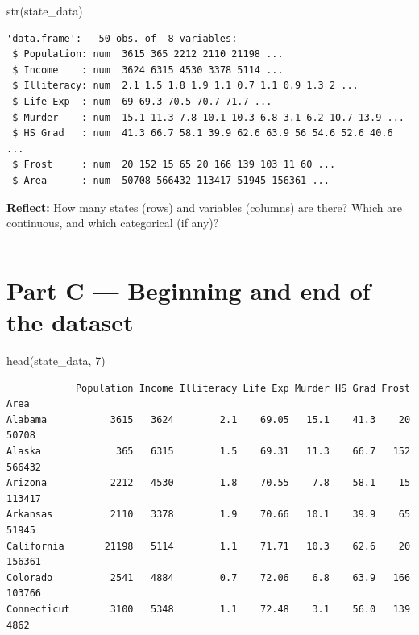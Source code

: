 \documentclass[
  letterpaper,
  DIV=11,
  numbers=noendperiod]{scrreprt}
\newenvironment{Shaded}{\begin{snugshade}}{\end{snugshade}}
\newcommand{\DecValTok}[1]{\textcolor[rgb]{0.68,0.00,0.00}{#1}}
\newcommand{\FunctionTok}[1]{\textcolor[rgb]{0.28,0.35,0.67}{#1}}
\newcommand{\NormalTok}[1]{\textcolor[rgb]{0.00,0.23,0.31}{#1}}
\begin{document}
\begin{Shaded}
\begin{Highlighting}[]
\FunctionTok{str}\NormalTok{(state\_data)}
\end{Highlighting}
\end{Shaded}

\begin{verbatim}
'data.frame':   50 obs. of  8 variables:
 $ Population: num  3615 365 2212 2110 21198 ...
 $ Income    : num  3624 6315 4530 3378 5114 ...
 $ Illiteracy: num  2.1 1.5 1.8 1.9 1.1 0.7 1.1 0.9 1.3 2 ...
 $ Life Exp  : num  69 69.3 70.5 70.7 71.7 ...
 $ Murder    : num  15.1 11.3 7.8 10.1 10.3 6.8 3.1 6.2 10.7 13.9 ...
 $ HS Grad   : num  41.3 66.7 58.1 39.9 62.6 63.9 56 54.6 52.6 40.6 ...
 $ Frost     : num  20 152 15 65 20 166 139 103 11 60 ...
 $ Area      : num  50708 566432 113417 51945 156361 ...
\end{verbatim}

\textbf{Reflect:} How many states (rows) and variables (columns) are
there? Which are continuous, and which categorical (if any)?

\begin{center}\rule{0.5\linewidth}{0.5pt}\end{center}

\section{Part C --- Beginning and end of the
dataset}\label{part-c-beginning-and-end-of-the-dataset}

\begin{Shaded}
\begin{Highlighting}[]
\FunctionTok{head}\NormalTok{(state\_data, }\DecValTok{7}\NormalTok{)}
\end{Highlighting}
\end{Shaded}

\begin{verbatim}
            Population Income Illiteracy Life Exp Murder HS Grad Frost   Area
Alabama           3615   3624        2.1    69.05   15.1    41.3    20  50708
Alaska             365   6315        1.5    69.31   11.3    66.7   152 566432
Arizona           2212   4530        1.8    70.55    7.8    58.1    15 113417
Arkansas          2110   3378        1.9    70.66   10.1    39.9    65  51945
California       21198   5114        1.1    71.71   10.3    62.6    20 156361
Colorado          2541   4884        0.7    72.06    6.8    63.9   166 103766
Connecticut       3100   5348        1.1    72.48    3.1    56.0   139   4862
\end{verbatim}
\end{document}
